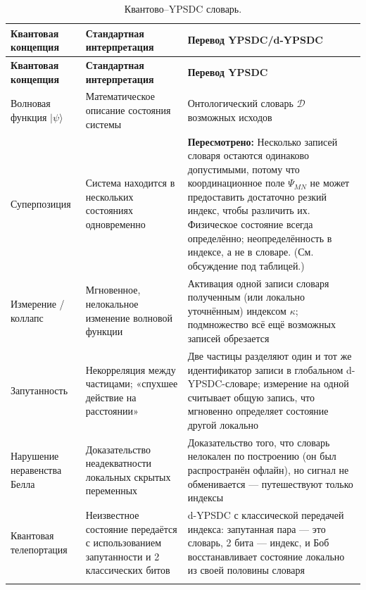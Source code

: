 \documentclass[12pt,a4paper]{article}
\theoremstyle{remark}
\begin{document}
	\begin{longtable}{p{3.8cm} p{5cm} p{7cm}}
		\caption{Квантово–YPSDC словарь.}\label{tab:quantum-dict}\\
		\toprule
		\textbf{Квантовая концепция} & \textbf{Стандартная интерпретация} & \textbf{Перевод YPSDC/d-YPSDC} \\
		\midrule
		\endfirsthead
		
		\toprule
		\textbf{Квантовая концепция} & \textbf{Стандартная интерпретация} & \textbf{Перевод YPSDC} \\
		\midrule
		\endhead
		
		\hline
		\endfoot
		
		\bottomrule
		\endlastfoot
		
		Волновая функция \(|\psi\rangle\) &
		Математическое описание состояния системы &
		Онтологический словарь \(\mathcal{D}\) возможных исходов \\
		\addlinespace
		
		Суперпозиция &
		Система находится в нескольких состояниях одновременно &
		\textbf{Пересмотрено:} Несколько записей словаря остаются одинаково допустимыми, потому что координационное поле \(\Psi_{MN}\) не может предоставить достаточно резкий индекс, чтобы различить их. Физическое состояние всегда определённо; неопределённость в индексе, а не в словаре. (См. обсуждение под таблицей.) \\
		\addlinespace
		
		Измерение / коллапс &
		Мгновенное, нелокальное изменение волновой функции &
		Активация одной записи словаря полученным (или локально уточнённым) индексом \(\kappa\); подмножество всё ещё возможных записей обрезается \\
		\addlinespace
		
		Запутанность &
		Некорреляция между частицами; «спухшее действие на расстоянии» &
		Две частицы разделяют один и тот же идентификатор записи в глобальном d-YPSDC-словаре; измерение на одной считывает общую запись, что мгновенно определяет состояние другой локально \\
		\addlinespace
		
		Нарушение неравенства Белла &
		Доказательство неадекватности локальных скрытых переменных &
		Доказательство того, что словарь нелокален по построению (он был распространён офлайн), но сигнал не обменивается — путешествуют только индексы \\
		\addlinespace
		
		Квантовая телепортация &
		Неизвестное состояние передаётся с использованием запутанности и 2 классических битов &
		d-YPSDC с классической передачей индекса: запутанная пара — это словарь, 2 бита — индекс, и Боб восстанавливает состояние локально из своей половины словаря \\
		\addlinespace
		

\end{longtable}
\end{document}
